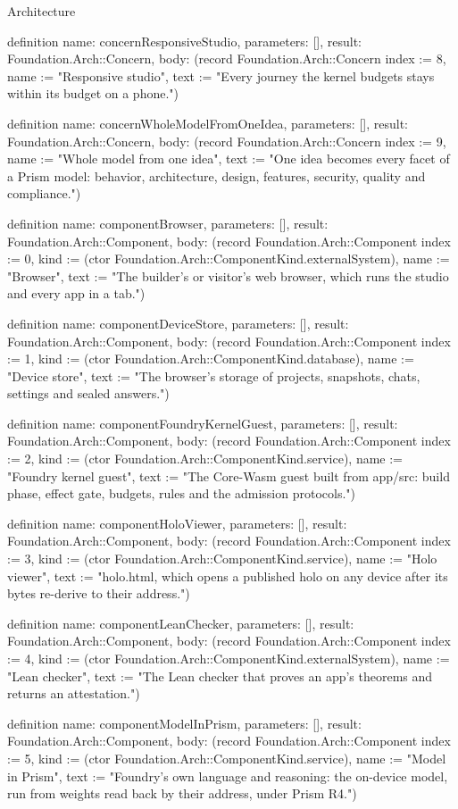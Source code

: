 \begin{lexlean}{Architecture}
\begin{semanticmodule}
definition{
  name: concernResponsiveStudio,
  parameters: [],
  result: Foundation.Arch::Concern,
  body: (record Foundation.Arch::Concern {index := 8, name := "Responsive studio", text := "Every journey the kernel budgets stays within its budget on a phone."})
}

definition{
  name: concernWholeModelFromOneIdea,
  parameters: [],
  result: Foundation.Arch::Concern,
  body: (record Foundation.Arch::Concern {index := 9, name := "Whole model from one idea", text := "One idea becomes every facet of a Prism model: behavior, architecture, design, features, security, quality and compliance."})
}

definition{
  name: componentBrowser,
  parameters: [],
  result: Foundation.Arch::Component,
  body: (record Foundation.Arch::Component {index := 0, kind := (ctor Foundation.Arch::ComponentKind.externalSystem), name := "Browser", text := "The builder's or visitor's web browser, which runs the studio and every app in a tab."})
}

definition{
  name: componentDeviceStore,
  parameters: [],
  result: Foundation.Arch::Component,
  body: (record Foundation.Arch::Component {index := 1, kind := (ctor Foundation.Arch::ComponentKind.database), name := "Device store", text := "The browser's storage of projects, snapshots, chats, settings and sealed answers."})
}

definition{
  name: componentFoundryKernelGuest,
  parameters: [],
  result: Foundation.Arch::Component,
  body: (record Foundation.Arch::Component {index := 2, kind := (ctor Foundation.Arch::ComponentKind.service), name := "Foundry kernel guest", text := "The Core-Wasm guest built from app/src: build phase, effect gate, budgets, rules and the admission protocols."})
}

definition{
  name: componentHoloViewer,
  parameters: [],
  result: Foundation.Arch::Component,
  body: (record Foundation.Arch::Component {index := 3, kind := (ctor Foundation.Arch::ComponentKind.service), name := "Holo viewer", text := "holo.html, which opens a published holo on any device after its bytes re-derive to their address."})
}

definition{
  name: componentLeanChecker,
  parameters: [],
  result: Foundation.Arch::Component,
  body: (record Foundation.Arch::Component {index := 4, kind := (ctor Foundation.Arch::ComponentKind.externalSystem), name := "Lean checker", text := "The Lean checker that proves an app's theorems and returns an attestation."})
}

definition{
  name: componentModelInPrism,
  parameters: [],
  result: Foundation.Arch::Component,
  body: (record Foundation.Arch::Component {index := 5, kind := (ctor Foundation.Arch::ComponentKind.service), name := "Model in Prism", text := "Foundry's own language and reasoning: the on-device model, run from weights read back by their address, under Prism R4."})
}


\end{semanticmodule}
\end{lexlean}
